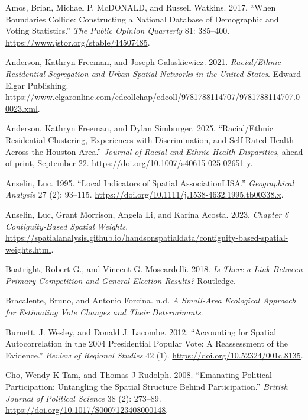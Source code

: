 \documentclass[
]{article}
\newlength{\cslhangindent}
\newenvironment{CSLReferences}[2] %
 {\begin{list}{}{%
  \setlength{\itemindent}{0pt}
  \setlength{\leftmargin}{0pt}
  \setlength{\parsep}{0pt}
  \ifodd #1
   \setlength{\leftmargin}{\cslhangindent}
   \setlength{\itemindent}{-1\cslhangindent}
  \fi
  \setlength{\itemsep}{#2\baselineskip}}}
 {\end{list}}
\begin{document}
\protect{}\label{refs}
\begin{CSLReferences}{1}{1}
Amos, Brian, Michael P. McDONALD, and Russell Watkins. 2017. {``When
Boundaries Collide: Constructing a National Database of Demographic and
Voting Statistics.''} \emph{The Public Opinion Quarterly} 81: 385--400.
\url{https://www.jstor.org/stable/44507485}.

Anderson, Kathryn Freeman, and Joseph Galaskiewicz. 2021.
\emph{Racial/Ethnic Residential Segregation and Urban Spatial Networks
in the United States}. Edward Elgar Publishing.
\url{https://www.elgaronline.com/edcollchap/edcoll/9781788114707/9781788114707.00023.xml}.

Anderson, Kathryn Freeman, and Dylan Simburger. 2025. {``Racial/Ethnic
Residential Clustering, Experiences with Discrimination, and Self-Rated
Health Across the Houston Area.''} \emph{Journal of Racial and Ethnic
Health Disparities}, ahead of print, September 22.
\url{https://doi.org/10.1007/s40615-025-02651-y}.

Anselin, Luc. 1995. {``Local Indicators of Spatial
Association{\textemdash}LISA.''} \emph{Geographical Analysis} 27 (2):
93--115. \url{https://doi.org/10.1111/j.1538-4632.1995.tb00338.x}.

Anselin, Luc, Grant Morrison, Angela Li, and Karina Acosta. 2023.
\emph{Chapter 6 Contiguity-Based Spatial Weights}.
\url{https://spatialanalysis.github.io/handsonspatialdata/contiguity-based-spatial-weights.html}.

Boatright, Robert G., and Vincent G. Moscardelli. 2018. \emph{Is There a
Link Between Primary Competition and General Election Results?}
Routledge.

Bracalente, Bruno, and Antonio Forcina. n.d. \emph{A Small-Area
Ecological Approach for Estimating Vote Changes and Their Determinants}.

Burnett, J. Wesley, and Donald J. Lacombe. 2012. {``Accounting for
Spatial Autocorrelation in the 2004 Presidential Popular Vote: A
Reassessment of the Evidence.''} \emph{Review of Regional Studies} 42
(1). \url{https://doi.org/10.52324/001c.8135}.

Cho, Wendy K Tam, and Thomas J Rudolph. 2008. {``Emanating Political
Participation: Untangling the Spatial Structure Behind Participation.''}
\emph{British Journal of Political Science} 38 (2): 273--89.
\url{https://doi.org/10.1017/S0007123408000148}.


\end{CSLReferences}
\end{document}
